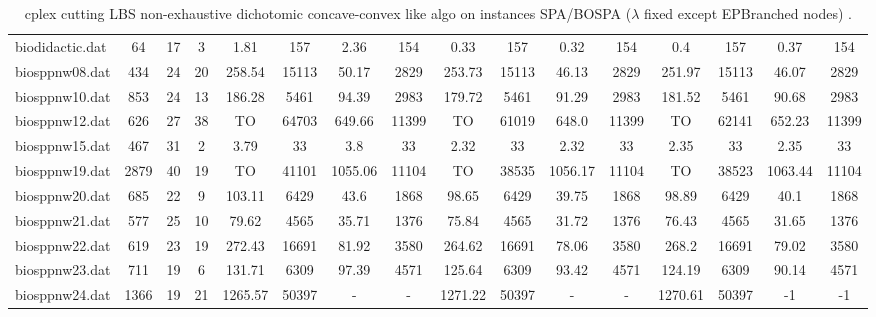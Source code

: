 \begin{sidewaystable}[!ht]
{\begin{tabular}{lccccccccccccccc}
biodidactic.dat & 64 & 17 & 3 & 1.81 & 157 & 2.36 & 154 & 0.33 & 157 &  \textcolor{blue2}{0.32} & 154 & 0.4 & 157 & 0.37 & 154 \\
biosppnw08.dat & 434 & 24 & 20 & 258.54 & 15113 & 50.17 & 2829 & 253.73 & 15113 & 46.13 & 2829 & 251.97 & 15113 & 46.07 & 2829 \\
biosppnw10.dat & 853 & 24 & 13 & 186.28 & 5461 & 94.39 & 2983 & 179.72 & 5461 & 91.29 & 2983 & 181.52 & 5461 & 90.68 & 2983 \\
biosppnw12.dat & 626 & 27 & 38 &  TO & 64703 & 649.66 & 11399 &  TO & 61019 & 648.0 & 11399 &  TO & 62141 & 652.23 & 11399 \\
biosppnw15.dat & 467 & 31 & 2 & 3.79 & 33 & 3.8 & 33 &  \textcolor{blue2}{2.32} & 33 &  \textcolor{blue2}{2.32} & 33 & 2.35 & 33 & 2.35 & 33 \\
biosppnw19.dat & 2879 & 40 & 19 &  TO & 41101 &  \textcolor{blue2}{1055.06} & 11104 &  TO & 38535 & 1056.17 & 11104 &  TO & 38523 & 1063.44 & 11104 \\
biosppnw20.dat & 685 & 22 & 9 & 103.11 & 6429 & 43.6 & 1868 & 98.65 & 6429 &  \textcolor{blue2}{39.75} & 1868 & 98.89 & 6429 & 40.1 & 1868 \\
biosppnw21.dat & 577 & 25 & 10 & 79.62 & 4565 & 35.71 & 1376 & 75.84 & 4565 & 31.72 & 1376 & 76.43 & 4565 & 31.65 & 1376 \\
biosppnw22.dat & 619 & 23 & 19 & 272.43 & 16691 & 81.92 & 3580 & 264.62 & 16691 &  \textcolor{blue2}{78.06} & 3580 & 268.2 & 16691 & 79.02 & 3580 \\
biosppnw23.dat & 711 & 19 & 6 & 131.71 & 6309 & 97.39 & 4571 & 125.64 & 6309 & 93.42 & 4571 & 124.19 & 6309 & 90.14 & 4571 \\
biosppnw24.dat & 1366 & 19 & 21 &  \textcolor{blue2}{1265.57} & 50397 &  - &  - & 1271.22 & 50397 &  - &  - & 1270.61 & 50397 & -1 & -1 \\
\bottomrule
\end{tabular}
}%
\caption{cplex cutting LBS non-exhaustive dichotomic concave-convex like algo on instances SPA/BOSPA ($\lambda$ fixed except EPBranched nodes) .}
\end{sidewaystable}
